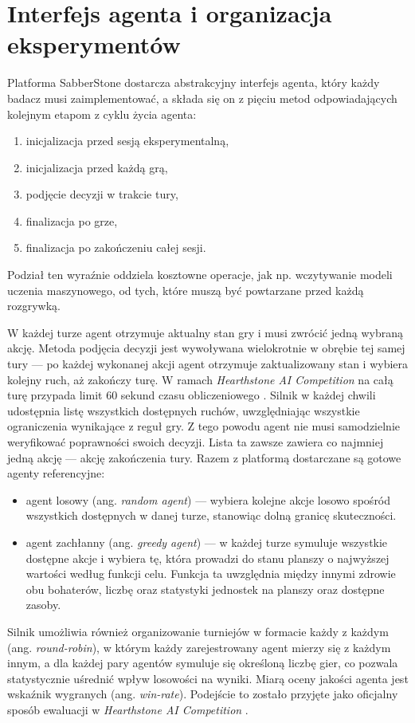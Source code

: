 \section{Interfejs agenta i organizacja eksperymentów} \label{sec:sabber_agent_interface}

Platforma SabberStone dostarcza abstrakcyjny interfejs agenta, który każdy badacz musi zaimplementować, a składa się on z pięciu metod odpowiadających kolejnym etapom z cyklu życia agenta:

\begin{enumerate}
    \item inicjalizacja przed sesją eksperymentalną,
    \item inicjalizacja przed każdą grą,
    \item podjęcie decyzji w trakcie tury,
    \item finalizacja po grze,
    \item finalizacja po zakończeniu całej sesji.
\end{enumerate}

Podział ten wyraźnie oddziela kosztowne operacje, jak np. wczytywanie modeli uczenia maszynowego, od tych, które muszą być powtarzane przed każdą rozgrywką.

W każdej turze agent otrzymuje aktualny stan gry i musi zwrócić jedną wybraną akcję. Metoda podjęcia decyzji jest wywoływana wielokrotnie w obrębie tej samej tury --- po każdej wykonanej akcji agent otrzymuje zaktualizowany stan i wybiera kolejny ruch, aż zakończy turę. W ramach \textit{Hearthstone AI Competition} na całą turę przypada limit 60 sekund czasu obliczeniowego \cite{dockhorn2019}. Silnik w każdej chwili udostępnia listę wszystkich dostępnych ruchów, uwzględniając wszystkie ograniczenia wynikające z reguł gry. Z tego powodu agent nie musi samodzielnie weryfikować poprawności swoich decyzji. Lista ta zawsze zawiera co najmniej jedną akcję --- akcję zakończenia tury. Razem z platformą dostarczane są gotowe agenty referencyjne:
\begin{itemize}
    \item agent losowy (ang. \textit{random agent}) --- wybiera kolejne akcje losowo spośród wszystkich dostępnych w danej turze, stanowiąc dolną granicę skuteczności.
    \item agent zachłanny (ang. \textit{greedy agent}) --- w każdej turze symuluje wszystkie dostępne akcje i wybiera tę, która prowadzi do stanu planszy o najwyższej wartości według funkcji celu. Funkcja ta uwzględnia między innymi zdrowie obu bohaterów, liczbę oraz statystyki jednostek na planszy oraz dostępne zasoby.
\end{itemize}

Silnik umożliwia również organizowanie turniejów w formacie każdy z każdym (ang. \textit{round-robin}), w którym każdy zarejestrowany agent mierzy się z każdym innym, a dla każdej pary agentów symuluje się określoną liczbę gier, co pozwala statystycznie uśrednić wpływ losowości na wyniki. Miarą oceny jakości agenta jest wskaźnik wygranych (ang. \textit{win-rate}). Podejście to zostało przyjęte jako oficjalny sposób ewaluacji w \textit{Hearthstone AI Competition} \cite{hearthstone_competition}.
